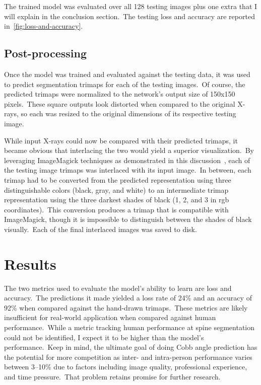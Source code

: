 \documentclass[conference]{IEEEtran}
\begin{document}
    The trained model was evaluated over all 128 testing images plus one extra that I will explain in the conclusion section.\ The testing loss and accuracy are reported in~\autoref{fig:loss-and-accuracy}.

    \subsection{Post-processing}\label{subsec:post-processing}

    Once the model was trained and evaluated against the testing data, it was used to predict segmentation trimaps for each of the testing images.\ Of course, the predicted trimaps were normalized to the network's output size of 150x150 pixels.\ These square outputs look distorted when compared to the original X-rays, so each was resized to the original dimensions of its respective testing image.

    While input X-rays could now be compared with their predicted trimaps, it became obvious that interlacing the two would yield a superior visualization.\ By leveraging ImageMagick techniques as demonstrated in this discussion~\cite{image-magick}, each of the testing image trimaps was interlaced with its input image.\ In between, each trimap had to be converted from the predicted representation using three distinguishable colors (black, gray, and white) to an intermediate trimap representation using the three darkest shades of black (1, 2, and 3 in rgb coordinates).\ This conversion produces a trimap that is compatible with ImageMagick, though it is impossible to distinguish between the shades of black visually.\ Each of the final interlaced images was saved to disk.

    \section{Results}\label{sec:results}

    The two metrics used to evaluate the model's ability to learn are loss and accuracy.\ The predictions it made yielded a loss rate of 24\% and an accuracy of 92\% when compared against the hand-drawn trimaps.\ These metrics are likely insufficient for real-world application when compared against human performance.\ While a metric tracking human performance at spine segmentation could not be identified, I expect it to be higher than the model's performance.\ Keep in mind, the ultimate goal of doing Cobb angle prediction has the potential for more competition as inter- and intra-person performance varies between 3--10\%\cite{doi:10.14245/ns.1938426.213} due to factors including image quality, professional experience, and time pressure.\ That problem retains promise for further research.
\end{document}
